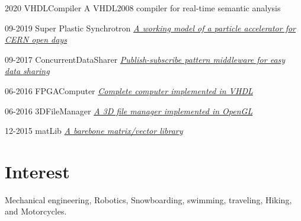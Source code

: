 \documentclass[]{cv-style}          %
\begin{document}
\begin{entrylist}
    \entry
    {2020}
    {VHDLCompiler}
    {}
    {A VHDL2008 compiler for real-time semantic analysis }
    
    \entry
    {09-2019}
    {Super Plastic Synchrotron}
    {}
    {\emph{\href{https://physicsworld.com/a/photogenic-physics-cern-opens-its-doors-to-the-masses/}{A working model of a particle accelerator for CERN open days}}}
    
    
                \entry
    {09-2017}
    {ConcurrentDataSharer}
    {} 
    {\emph{\href{https://github.com/marso329/ConcurrentDataSharer}{Publish-subscribe pattern middleware for easy data sharing}}}
    
    
  \entry
    {06-2016}
    {FPGAComputer}
    {}
    {\emph{\href{https://github.com/marso329/FPGAComputer}{Complete computer implemented in VHDL}}}

\end{entrylist}

\begin{entrylist}


    
      \entry
    {06-2016}
    {3DFileManager}
    {}
    {\emph{\href{https://github.com/marso329/3DFileManager}{A 3D file manager implemented in OpenGL}}}
   
    
    
                   \entry
    {12-2015}
    {matLib}
    {}
    {\emph{\href{https://github.com/marso329/matLib}{A barebone matrix/vector library }}}
\end{entrylist}
\section{Interest}
Mechanical engineering, Robotics, Snowboarding, swimming, traveling, Hiking, and Motorcycles.
\end{document}
